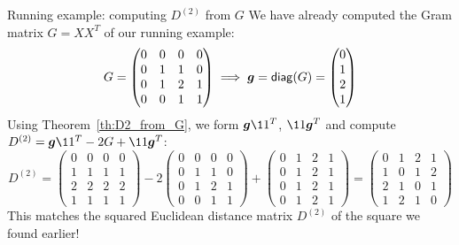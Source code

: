 \documentclass[aspectratio=169]{beamer}\usepackage[]{graphicx}\usepackage[]{xcolor}
\begin{document}
\begin{frame}{Running example: computing $D^{(2)}$ from $G$}
We have already computed the Gram matrix $G = XX^T$ of our running example:
\[
G = \begin{pmatrix}
0 & 0 & 0 & 0 \\
0 & 1 & 1 & 0 \\
0 & 1 & 2 & 1 \\
0 & 0 & 1 & 1
\end{pmatrix}
\implies
\bm{g} = \mathsf{diag}(G) = \begin{pmatrix} 0 \\ 1 \\ 2 \\ 1 \end{pmatrix}
\]
\vfill
Using Theorem~\ref{th:D2_from_G}, we form $\bg\11^T$, $\11\bg^T$ and compute $D^{(2)} = \bg\11^T - 2G + \11\bg^T$:
\[
D^{(2)} = \begin{pmatrix}
0 & 0 & 0 & 0 \\
1 & 1 & 1 & 1 \\
2 & 2 & 2 & 2 \\
1 & 1 & 1 & 1
\end{pmatrix}
- 2\begin{pmatrix}
0 & 0 & 0 & 0 \\
0 & 1 & 1 & 0 \\
0 & 1 & 2 & 1 \\
0 & 0 & 1 & 1
\end{pmatrix}
+ \begin{pmatrix}
0 & 1 & 2 & 1 \\
0 & 1 & 2 & 1 \\
0 & 1 & 2 & 1 \\
0 & 1 & 2 & 1
\end{pmatrix}
= \begin{pmatrix}
0 & 1 & 2 & 1 \\
1 & 0 & 1 & 2 \\
2 & 1 & 0 & 1 \\
1 & 2 & 1 & 0
\end{pmatrix}
\]
\vfill
This matches the squared Euclidean distance matrix $D^{(2)}$ of the square we found earlier!
\end{frame}
\end{document}
